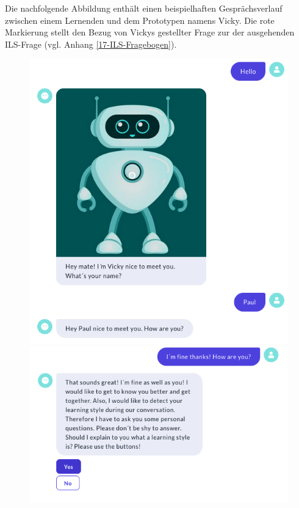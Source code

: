 Die nachfolgende Abbildung enthält einen beispielhaften Gesprächsverlauf zwischen einem 
Lernenden und dem Prototypen namens Vicky. Die rote Markierung stellt den Bezug von Vickys gestellter Frage zur der
ausgehenden ILS-Frage (vgl. Anhang \ref{17-ILS-Fragebogen}).
\begin{figure}[H]
  \centering
  \includegraphics[width=0.7\linewidth]{images/Talk_roterMarker/T0.PNG}
  \includegraphics[width=0.7\linewidth]{images/Talk_roterMarker/T0.2.png}
 \end{figure} 
